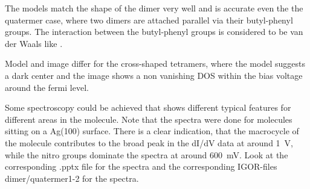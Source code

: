 

% 


The models match the shape of the dimer very well and is accurate even the the quatermer case, where two dimers are attached parallel via their butyl-phenyl groups. The interaction between the butyl-phenyl groups is considered to be van der Waals like \cite{iacovita_controlling_2012}.

Model and image differ for the cross-shaped tetramers, where the model suggests a dark center and the image shows a non vanishing DOS within the bias voltage around the fermi level.

Some spectroscopy could be achieved that shows different typical features for different areas in the molecule. Note that the spectra were done for molecules sitting on a Ag(100) surface.
There is a clear indication, that the macrocycle of the molecule contributes to the broad peak in the dI/dV data at around \SI{1}{\V}, while the nitro groups dominate the spectra at around \SI{600}{\milli \V}. 
Look at the corresponding .pptx file for the spectra and the corresponding IGOR-files dimer/quatermer1-2 for the spectra.

